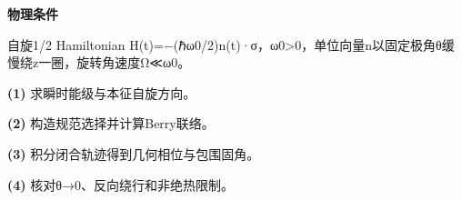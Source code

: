 \textbf{物理条件}\par 自旋1/2 Hamiltonian H(t)=−(ℏω0/2)n(t)·σ，ω0>0，单位向量n以固定极角θ缓慢绕z一圈，旋转角速度Ω≪ω0。
\par\noindent\textbf{(1)} 求瞬时能级与本征自旋方向。
\par\noindent\textbf{(2)} 构造规范选择并计算Berry联络。
\par\noindent\textbf{(3)} 积分闭合轨迹得到几何相位与包围固角。
\par\noindent\textbf{(4)} 核对θ→0、反向绕行和非绝热限制。
